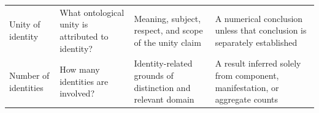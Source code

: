 \begin{table}[htbp]
\begin{tabularx}{\textwidth}{
    @{}
    p{}
    X
    p{}
    p{}
    @{}
}
Unity of identity &
What ontological unity is attributed to identity? &
Meaning, subject, respect, and scope of the unity claim &
A numerical conclusion unless that conclusion is separately established
\\

Number of identities &
How many identities are involved? &
Identity-related grounds of distinction and relevant domain &
A result inferred solely from component, manifestation, or aggregate counts
\\

\bottomrule
\end{tabularx}
\end{table}

